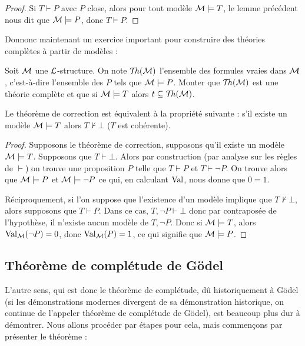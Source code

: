 \begin{proof}
    Si $T\vdash P$ avec $P$ close, alors pour tout modèle $\mathcal M\models T$, le lemme précédent nous dit que $\mathcal M\models P$, donc $T\vDash P$.
\end{proof}

Donnonc maintenant un exercice important pour construire des théories complètes à partir de modèles :

\begin{exo}
    Soit $\mathcal M$ une $\mathcal L$-structure. On note $\mathcal{T}\!h(\mathcal M)$ l'ensemble des formules vraies dans $\mathcal M$, c'est-à-dire l'ensemble des $P$ tels que $\mathcal M\models P$. Monter que $\mathcal{T}\!h(\mathcal M)$ est une théorie complète et que si $\mathcal M\models T$ alors $t\subseteq \mathcal{T}\!h(\mathcal M)$.
\end{exo}

\begin{prop}
    Le théorème de correction est équivalent à la propriété suivante : s'il existe un modèle $\mathcal M\models T$ alors $T\nvdash \bot$ ($T$ est cohérente).
\end{prop}

\begin{proof}
    Supposons le théorème de correction, supposons qu'il existe un modèle $\mathcal M\models T$. Supposons que $T\vdash \bot$. Alors par construction (par analyse sur les règles de $\vdash$) on trouve une proposition $P$ telle que $T\vdash P$ et $T\vdash \lnot P$. On trouve alors que $\mathcal M\models P$ et $\mathcal M\models \lnot P$ ce qui, en calculant $\mathrm{Val}$, nous donne que $0=1$.

    Réciproquement, si l'on suppose que l'existence d'un modèle implique que $T\nvdash \bot$, alors supposons que $T\vdash P$. Dans ce cas, $T,\lnot P \vdash \bot$ donc par contraposée de l'hypothèse, il n'existe aucun modèle de $T,\lnot P$. Donc si $\mathcal M\models T$, alors $\mathrm{Val}_{\mathcal M}(\lnot P)=0$, donc $\mathrm{Val}_{\mathcal M}(P)=1$, ce qui signifie que $\mathcal M\models P$.
\end{proof}

\subsection{Théorème de complétude de Gödel}

L'autre sens, qui est donc le théorème de complétude, dû historiquement à Gödel (si les démonstrations modernes divergent de sa démonstration historique, on continue de l'appeler théorème de complétude de Gödel), est beaucoup plus dur à démontrer. Nous allons procéder par étapes pour cela, mais commençons par présenter le théorème :

